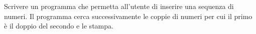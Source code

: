 \begin{Exercise}[label={ex:coppie}]
  Scrivere un programma che permetta all'utente di inserire una sequenza di numeri. Il programma cerca successivamente le coppie di numeri per cui il primo è il doppio del secondo e le stampa.
\end{Exercise}

\begin{Answer}[ref={ex:coppie}]
  
\end{Answer}
